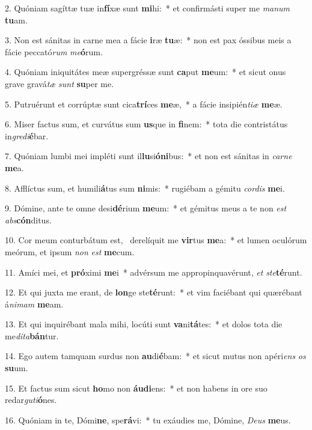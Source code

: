 2. Quóniam sagíttæ tuæ in\textbf{fí}xæ sunt \textbf{mi}hi:~*  et confirmásti super me \textit{ma}\textit{num} \textbf{tu}am.\

3. Non est sánitas in carne mea a fácie \textbf{i}ræ \textbf{tu}æ:~*  non est pax óssibus meis a fácie peccató\textit{rum} \textit{me}\textbf{ó}rum.\

4. Quóniam iniquitátes meæ supergréssæ sunt \textbf{ca}put \textbf{me}um:~*  et sicut onus grave gravá\textit{tæ} \textit{sunt} \textbf{su}per me.\

5. Putruérunt et corrúptæ sunt cica\textbf{trí}ces \textbf{me}æ,~*  a fácie insipién\textit{ti}\textit{æ} \textbf{me}æ.\

6. Miser factus sum, et curvátus sum \textbf{us}que in \textbf{fi}nem:~*  tota die contristátus in\textit{gre}\textit{di}\textbf{é}bar.\

7. Quóniam lumbi mei impléti sunt il\textbf{lu}si\textbf{ó}\textbf{ni}bus:~*  et non est sánitas in \textit{car}\textit{ne} \textbf{me}a.\

8. Afflíctus sum, et humili\textbf{á}tus sum \textbf{ni}mis:~*  rugiébam a gémitu \textit{cor}\textit{dis} \textbf{me}i.\

9. Dómine, ante te omne desi\textbf{dé}rium \textbf{me}um:~*  et gémitus meus a te non \textit{est} \textit{abs}\textbf{cón}ditus.\

10. Cor meum conturbátum est, \dag\  derelíquit me \textbf{vir}tus \textbf{me}a:~*  et lumen oculórum meórum, et ipsum \textit{non} \textit{est} \textbf{me}cum.\

11. Amíci mei, et \textbf{pró}ximi \textbf{me}i~*  advérsum me appropinquavérunt, \textit{et} \textit{ste}\textbf{té}runt.\

12. Et qui juxta me erant, de \textbf{lon}ge ste\textbf{té}runt:~*  et vim faciébant qui quærébant á\textit{ni}\textit{mam} \textbf{me}am.\

13. Et qui inquirébant mala mihi, locúti sunt \textbf{va}ni\textbf{tá}tes:~*  et dolos tota die me\textit{di}\textit{ta}\textbf{bán}tur.\

14. Ego autem tamquam surdus non \textbf{au}di\textbf{é}bam:~*  et sicut mutus non apéri\textit{ens} \textit{os} \textbf{su}um.\

15. Et factus sum sicut \textbf{ho}mo non \textbf{áu}\textbf{di}ens:~*  et non habens in ore suo redar\textit{gu}\textit{ti}\textbf{ó}nes.\

16. Quóniam in te, Dómi\textbf{ne}, spe\textbf{rá}vi:~*  tu exáudies me, Dómine, \textit{De}\textit{us} \textbf{me}us.\

